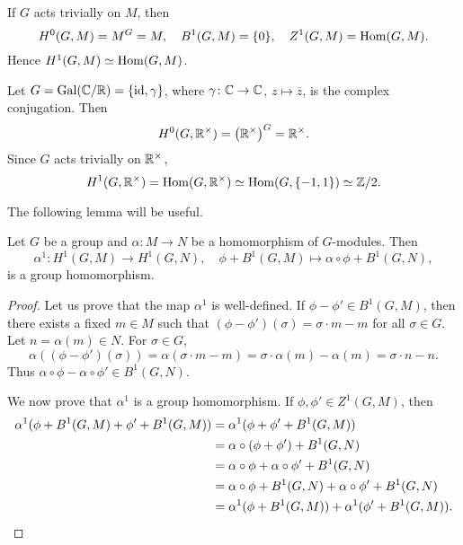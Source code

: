 \begin{example}
    If $G$ acts trivially on $M$, then 
    \[
    H^0(G,M)=M^G=M,
    \quad 
    B^1(G,M)=\{0\},
    \quad 
    Z^1(G,M)=\operatorname{Hom}(G,M).
    \]
    Hence 
    $H^1(G,M)\simeq\operatorname{Hom}(G,M)$.
\end{example}

\begin{example}
    Let $G=\operatorname{Gal}(\mathbb{C}/\mathbb{R})=\{\operatorname{id},\gamma\}$, where $\gamma\colon\mathbb{C}\to\mathbb{C}$, $z\mapsto\overline{z}$, is the complex conjugation. Then
    \[
    H^0(G,\mathbb{R}^\times)=\left(\mathbb{R}^\times\right)^G=\mathbb{R}^\times.
    \]
    Since $G$ acts trivially on $\mathbb{R}^\times$, 
    \[
    H^1(G,\mathbb{R}^\times)=\operatorname{Hom}(G,\mathbb{R}^\times)\simeq\operatorname{Hom}(G,\{-1,1\})\simeq\mathbb{Z}/2.
    \]
\end{example}

The following lemma will be useful. 

\begin{lemma}
\label{lem:H1_maps}
    Let $G$ be a group and 
    $\alpha\colon M\to N$ be a homomorphism of $G$-modules. 
    Then 
    \[
    \alpha^1\colon H^1(G,M)\to H^1(G,N),\quad 
    \phi+B^1(G,M)\mapsto \alpha\circ\phi+B^1(G,N),
    \]
    is a group homomorphism. 
\end{lemma}

\begin{proof}
    Let us prove that the map $\alpha^1$ is well-defined. If 
    $\phi-\phi'\in B^1(G,M)$, then 
    there exists a fixed 
    $m\in M$ such that 
    $(\phi-\phi')(\sigma)=\sigma\cdot m-m$ for all $\sigma\in G$. 
    Let $n=\alpha(m)\in N$. 
    For $\sigma\in G$, 
    \[
    \alpha((\phi-\phi')(\sigma))=\alpha(\sigma\cdot m-m)
    =\sigma\cdot \alpha(m)-\alpha(m)=\sigma\cdot n-n. 
    \]
    Thus $\alpha\circ\phi-\alpha\circ\phi'\in B^1(G,N)$. 

    We now prove that $\alpha^1$ is a group homomorphism. If 
    $\phi,\phi'\in Z^1(G,M)$, then 
    \begin{align*}
    \alpha^1(\phi+B^1(G,M)+\phi'+B^1(G,M))
    &=\alpha^1(\phi+\phi'+B^1(G,M))\\
    &=\alpha\circ(\phi+\phi')+B^1(G,N)\\
    &=\alpha\circ\phi+\alpha\circ\phi'+B^1(G,N)\\
    &=\alpha\circ\phi+B^1(G,N)+\alpha\circ\phi'+B^1(G,N)\\
    &=\alpha^1(\phi+B^1(G,M))+\alpha^1(\phi'+B^1(G,M)).\qedhere
    \end{align*}
\end{proof}

